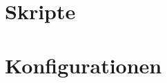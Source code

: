 \appendix


\chapter{Skripte}
\label{ch:skripte}
%	
%	
%	


\chapter{Konfigurationen}
\label{ch:konfigurationen}
%	
%	
\clearpage